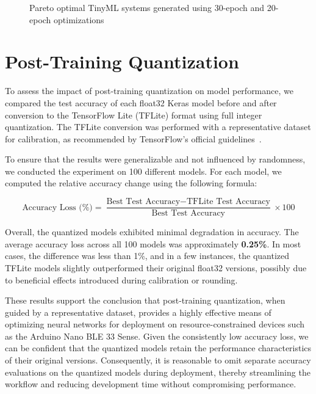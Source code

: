 \begin{figure}[ht]
    \centering
    \caption{Pareto optimal TinyML systems generated using 30-epoch and 20-epoch optimizations}
    \label{fig:pareto_plot_comparison}
\end{figure}


\clearpage

\section{Post-Training Quantization}

To assess the impact of post-training quantization on model performance, we compared the test accuracy of each float32 Keras model before and after conversion to the TensorFlow Lite (TFLite) format using full integer quantization. The TFLite conversion was performed with a representative dataset for calibration, as recommended by TensorFlow's official guidelines~\cite{tensorflow2023quantization}.

To ensure that the results were generalizable and not influenced by randomness, we conducted the experiment on 100 different models. For each model, we computed the relative accuracy change using the following formula:

\[
\text{Accuracy Loss (\%)} = \frac{\text{Best Test Accuracy} - \text{TFLite Test Accuracy}}{\text{Best Test Accuracy}} \times 100
\]

Overall, the quantized models exhibited minimal degradation in accuracy. The average accuracy loss across all 100 models was approximately \textbf{0.25\%}. In most cases, the difference was less than 1\%, and in a few instances, the quantized TFLite models slightly outperformed their original float32 versions, possibly due to beneficial effects introduced during calibration or rounding.

These results support the conclusion that post-training quantization, when guided by a representative dataset, provides a highly effective means of optimizing neural networks for deployment on resource-constrained devices such as the Arduino Nano BLE 33 Sense. Given the consistently low accuracy loss, we can be confident that the quantized models retain the performance characteristics of their original versions. Consequently, it is reasonable to omit separate accuracy evaluations on the quantized models during deployment, thereby streamlining the workflow and reducing development time without compromising performance.
